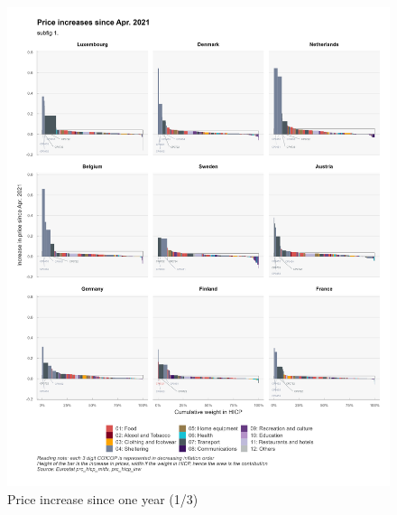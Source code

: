 \documentclass[
  9pt,
  a4paper,
  DIV=11,
  numbers=noendperiod,
  oneside]{scrartcl}
\begin{document}
\begin{figure}

\caption{Price increase since one year (1/3)}

{\centering \includegraphics[width=17cm,height=\textheight]{../svg/depuis_1y_1.png}

}

\end{figure}
\end{document}
